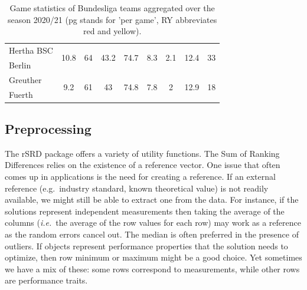 \begin{table}[t]
\begin{tabular}{lccccccc|c}
Hertha BSC       & \multirow{2}{*}{10.8}        & \multirow{2}{*}{64}          & \multirow{2}{*}{43.2}            & \multirow{2}{*}{74.7}    & \multirow{2}{*}{8.3}            & \multirow{2}{*}{2.1}            & \multirow{2}{*}{12.4}         & \multirow{2}{*}{33}     \\
Berlin        &                              &                              &                                  &                          &                                 &                                 &                               &                         \\
Greuther      & \multirow{2}{*}{9.2}         & \multirow{2}{*}{61}          & \multirow{2}{*}{43}              & \multirow{2}{*}{74.8}    & \multirow{2}{*}{7.8}            & \multirow{2}{*}{2}              & \multirow{2}{*}{12.9}         & \multirow{2}{*}{18}     \\
Fuerth        &                              &                              &                                  &                          &                                 &                                 &                               &                         \\ \hline
\end{tabular}

\caption{Game statistics of Bundesliga teams aggregated over the season 2020/21 (pg stands for 'per game', RY abbreviates red and yellow).}\label{tab:bundesliga}
\end{table}

\subsection{Preprocessing}\label{sec:preprocessing}

The rSRD package offers a variety of utility functions. The Sum of Ranking Differences relies on the existence of a reference vector. One issue that often comes up in applications is the need for creating a reference. If an external reference (e.g.\ industry standard, known theoretical value) is not readily available, we might still be able to extract one from the data. For instance, if the solutions represent independent measurements then taking the average of the columns (\textit{i.e.}\ the average of the row values for each row) may work as a reference as the random errors cancel out. The median is often preferred in the presence of outliers. If objects represent performance properties that the solution needs to optimize, then row minimum or maximum might be a good choice. Yet sometimes we have a mix of these: some rows correspond to measurements, while other rows are performance traits.

